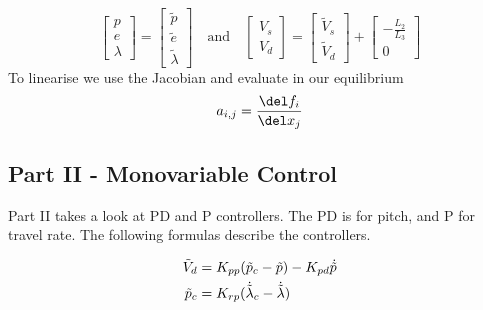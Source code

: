 \begin{equation}
    \begin{bmatrix}
        p \\ e \\ \lambda
    \end{bmatrix}
    =
    \begin{bmatrix}
        \tilde{p} \\ \tilde{e} \\ \tilde{\lambda}
    \end{bmatrix}
    \quad \text{and} \quad
    \begin{bmatrix}
        V_s \\ V_d
    \end{bmatrix}
    =
    \begin{bmatrix}
        \tilde{V}_s \\ \tilde{V}_d
    \end{bmatrix}
    +
    \begin{bmatrix}
        -\frac{L_2}{L_3} \\ 0
    \end{bmatrix}
\end{equation}
To linearise we use the Jacobian and evaluate in our equilibrium
\begin{equation}
    a_{i,j} = \frac{\del f_i}{\del x_j}
\end{equation}

\subsection{Part II - Monovariable Control}\label{subsec:part2}
Part II takes a look at PD and P controllers. The PD is for pitch, and P for travel rate. The following formulas describe the controllers.

\begin{align}
        \tilde{V}_d &= K_{pp} (\tilde{p}_c - \tilde{p}) - K_{pd}\dot{\tilde{p}}  \label{eq:P2_PD}\\  
        \tilde{p}_c &= K_{rp} (\dot{\tilde{\lambda}}_c - \dot{\tilde{\lambda}}) \label{eq:P2_P}
\end{align}

